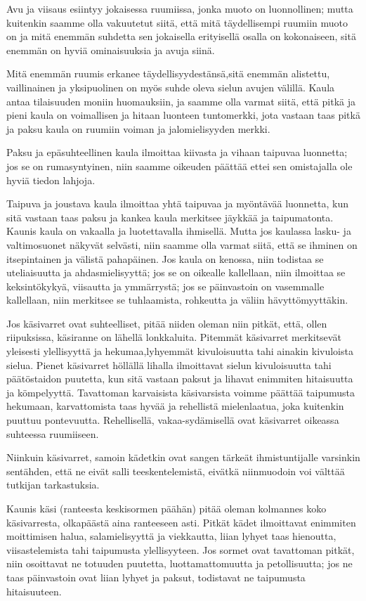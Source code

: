 \documentclass[11pt, twoside, finnish, a5paper]{book}
\begin{document}
Avu ja viisaus esiintyy jokaisessa ruumiissa, jonka
muoto on luonnollinen; mutta kuitenkin saamme olla
vakuutetut siitä, että mitä täydellisempi ruumiin muoto
on ja mitä enemmän suhdetta sen jokaisella erityisellä
osalla on kokonaiseen, sitä enemmän on hyviä
ominaisuuksia ja avuja siinä.

Mitä enemmän ruumis erkanee täydellisyydestänsä,sitä enemmän
alistettu, vaillinainen ja yksipuolinen on
myös suhde oleva sielun avujen välillä.
Kaula antaa tilaisuuden moniin huomauksiin, ja saamme
olla varmat siitä, että pitkä ja pieni kaula on voimallisen
ja hitaan luonteen tuntomerkki, jota vastaan taas pitkä ja
paksu kaula on ruumiin voiman ja jalomielisyyden merkki.

Paksu ja epäsuhteellinen kaula ilmoittaa kiivasta ja
vihaan taipuvaa luonnetta; jos se on rumasyntyinen, niin
saamme oikeuden päättää ettei sen omistajalla ole hyviä
tiedon lahjoja.

Taipuva ja joustava kaula ilmoittaa yhtä taipuvaa ja
myöntävää luonnetta, kun sitä vastaan taas paksu ja
kankea kaula merkitsee jäykkää ja taipumatonta. Kaunis
kaula on vakaalla ja luotettavalla ihmisellä. Mutta jos
kaulassa lasku- ja valtimosuonet näkyvät selvästi, niin
saamme olla varmat siitä, että se ihminen on itsepintainen
ja välistä pahapäinen. Jos kaula on kenossa, niin
todistaa se uteliaisuutta ja ahdasmielisyyttä; jos se on
oikealle kallellaan, niin ilmoittaa se keksintökykyä, 
viisautta ja ymmärrystä; jos se päinvastoin on vasemmalle
kallellaan, niin merkitsee se tuhlaamista, rohkeutta ja
väliin hävyttömyyttäkin.

Jos käsivarret ovat suhteelliset, pitää niiden oleman
niin pitkät, että, ollen riipuksissa, käsiranne on lähellä
lonkkaluita. Pitemmät käsivarret merkitsevät yleisesti
ylellisyyttä ja hekumaa,lyhyemmät kivuloisuutta tahi
ainakin kivuloista sielua.
Pienet käsivarret höllällä lihalla
ilmoittavat sielun kivuloisuutta tahi päätöstaidon
puutetta, kun sitä vastaan paksut ja lihavat enimmiten
hitaisuutta ja kömpelyyttä.
Tavattoman karvaisista käsivarsista voimme päättää
taipumusta hekumaan, karvattomista taas hyvää ja rehellistä
mielenlaatua, joka kuitenkin puuttuu pontevuutta. Rehellisellä,
vakaa-sydämisellä ovat käsivarret oikeassa suhteessa ruumiiseen.

Niinkuin käsivarret, samoin kädetkin ovat sangen
tärkeät ihmistuntijalle varsinkin sentähden, että ne eivät
salli teeskentelemistä, eivätkä niinmuodoin voi välttää
tutkijan tarkastuksia.

Kaunis käsi (ranteesta keskisormen päähän) pitää oleman
kolmannes koko käsivarresta, olkapäästä aina ranteeseen asti.
Pitkät kädet ilmoittavat enimmiten
moittimisen halua, salamielisyyttä ja viekkautta, liian
lyhyet taas hienoutta, viisastelemista tahi taipumusta
ylellisyyteen. Jos sormet ovat tavattoman pitkät, niin
osoittavat ne totuuden puutetta, luottamattomuutta ja petollisuutta;
jos ne taas päinvastoin ovat liian lyhyet
ja paksut, todistavat ne taipumusta hitaisuuteen.
\end{document}
